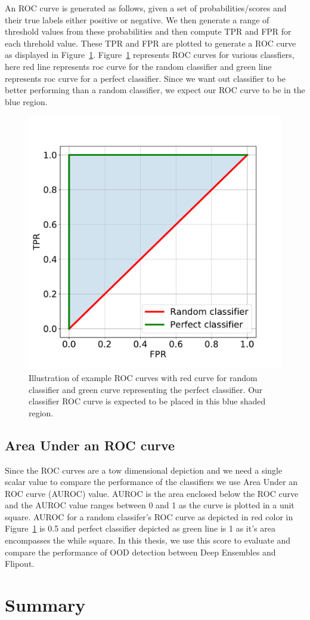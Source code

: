 An ROC curve is generated as follows, given a set of probabilities/scores and their true labels either positive or negative.
We then generate a range of threshold values from these probabilities and then compute TPR and FPR for each threhold value.
These TPR and FPR are plotted to generate a ROC curve as displayed in Figure~\ref{fig:ROC_curve_example}. 
Figure~\ref{fig:ROC_curve_example} represents ROC curves for various classfiers, here red line represents roc curve for the random classifier and green line represents roc curve for a perfect classifier.
Since we want out classifier to be better performing than a random classifier, we expect our ROC curve to be in the blue region.
\begin{figure}[!ht]
    \centering
    \includegraphics[scale=0.35]{images/ROC_curve_example.pdf}
    \caption{Illustration of example ROC curves with red curve for random classifier and green curve representing the perfect classifier.
    Our classifier ROC curve is expected to be placed in this blue shaded region.}
    \label{fig:ROC_curve_example}
\end{figure}

\subsection{Area Under an ROC curve}
Since the ROC curves are a tow dimensional depiction and we need a single scalar value to compare the performance of the classifiers we use Area Under an ROC curve (AUROC) value.
AUROC is the area enclosed below the ROC curve and the AUROC value ranges between 0 and 1 as the curve is plotted in a unit square.
AUROC for a random classifer's ROC curve as depicted in red color in Figure~\ref{fig:ROC_curve_example} is 0.5 and perfect classifier depicted as green line is 1 as it's area encompasses the while square.
In this thesis, we use this score to evaluate and  compare the performance of OOD detection between Deep Ensembles and Flipout.

\section{Summary}


